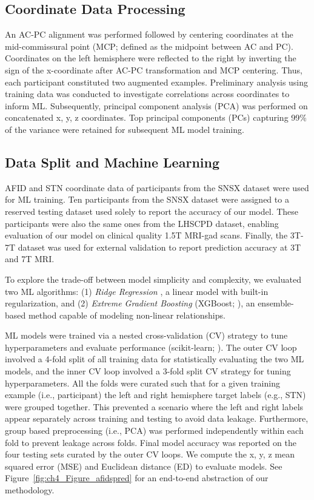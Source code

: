 \subsection{Coordinate Data Processing}
An AC-PC alignment was performed followed by centering coordinates at the mid-commissural point (MCP; defined as the midpoint between AC and PC). Coordinates on the left hemisphere were reflected to the right by inverting the sign of the x-coordinate after AC-PC transformation and MCP centering. Thus, each participant constituted two augmented examples. Preliminary analysis using training data was conducted to investigate correlations across coordinates to inform ML. Subsequently, principal component analysis (PCA) was performed on concatenated x, y, z coordinates. Top principal components (PCs) capturing 99\% of the variance were retained for subsequent ML model training.

\subsection{Data Split and Machine Learning}\label{chap:afidspredML}
AFID and STN coordinate data of participants from the SNSX dataset were used for ML training. Ten participants from the SNSX dataset were assigned to a reserved testing dataset used solely to report the accuracy of our model. These participants were also the same ones from the LHSCPD dataset, enabling evaluation of our model on clinical quality 1.5T MRI-gad scans. Finally, the 3T-7T dataset was used for external validation to report prediction accuracy at 3T and 7T MRI.

To explore the trade-off between model simplicity and complexity, we evaluated two ML algorithms: (1) \textit{Ridge Regression} \cite{Hoerl1970-so}, a linear model with built-in regularization, and (2) \textit{Extreme Gradient Boosting} (XGBoost; \cite{Friedman2001-hp}), an ensemble-based method capable of modeling non-linear relationships. 

ML models were trained via a nested cross-validation (CV) strategy to tune hyperparameters and evaluate performance (scikit-learn; \cite{Pedregosa2012-ab}). The outer CV loop involved a 4-fold split of all training data for statistically evaluating the two ML models, and the inner CV loop involved a 3-fold split CV strategy for tuning hyperparameters. All the folds were curated such that for a given training example (i.e., participant) the left and right hemisphere target labels (e.g., STN) were grouped together. This prevented a scenario where the left and right labels appear separately across training and testing to avoid data leakage. Furthermore, group based preprocessing (i.e., PCA) was performed independently within each fold to prevent leakage across folds. Final model accuracy was reported on the four testing sets curated by the outer CV loops. We compute the x, y, z mean squared error (MSE) and Euclidean distance (ED) to evaluate models. See Figure~\ref{fig:ch4_Figure_afidspred} for an end-to-end abstraction of our methodology.

